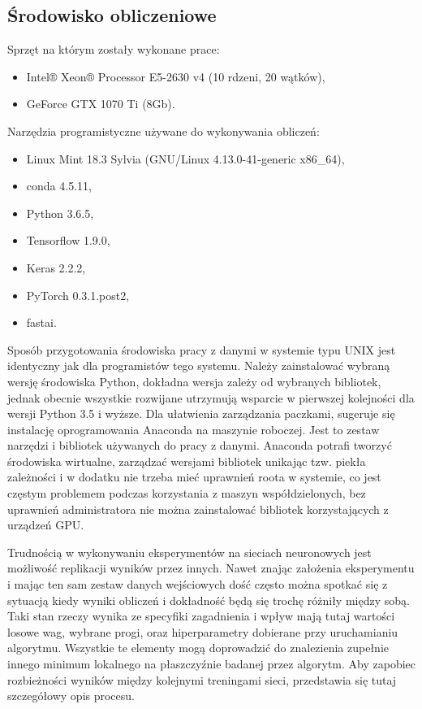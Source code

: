 \documentclass[12pt,a4paper,twoside,titlepage,openright]{book}
\begin{document}
\subsection{Środowisko obliczeniowe}
Sprzęt na którym zostały wykonane prace:
\begin{itemize}
\item Intel® Xeon® Processor E5-2630 v4 (10 rdzeni, 20 wątków),
\item GeForce GTX 1070 Ti (8Gb).
\end{itemize}

Narzędzia programistyczne używane do wykonywania obliczeń:
\begin{itemize}
\item Linux Mint 18.3 Sylvia (GNU/Linux 4.13.0-41-generic x86\_64),
\item conda 4.5.11,
\item Python 3.6.5,
\item Tensorflow 1.9.0,
\item Keras 2.2.2,
\item PyTorch 0.3.1.post2,
\item fastai.
\end{itemize}

Sposób przygotowania środowiska pracy z danymi w systemie typu UNIX jest identyczny jak dla programistów tego systemu. Należy zainstalować wybraną wersję środowiska Python, dokładna wersja zależy od wybranych bibliotek, jednak obecnie wszystkie rozwijane utrzymują wsparcie w pierwszej kolejności dla wersji Python 3.5 i wyższe. Dla ułatwienia zarządzania paczkami, sugeruje się instalację oprogramowania Anaconda na maszynie roboczej. Jest to zestaw narzędzi i bibliotek używanych do pracy z danymi. Anaconda potrafi tworzyć środowiska wirtualne, zarządzać wersjami bibliotek unikając tzw. piekła zależności i w dodatku nie trzeba mieć uprawnień roota w systemie, co jest częstym problemem podczas korzystania z maszyn współdzielonych, bez uprawnień administratora nie można zainstalować bibliotek korzystających z urządzeń GPU.

Trudnością  w wykonywaniu eksperymentów na sieciach neuronowych jest możliwość replikacji wyników przez innych. Nawet znając założenia eksperymentu i mając ten sam zestaw danych wejściowych dość często można spotkać się z sytuacją kiedy wyniki obliczeń i dokładność będą się trochę różniły między sobą. Taki stan rzeczy wynika ze specyfiki zagadnienia i wpływ mają tutaj wartości losowe wag, wybrane progi, oraz hiperparametry dobierane przy uruchamianiu algorytmu. Wszystkie te elementy mogą doprowadzić do znalezienia zupełnie innego minimum lokalnego na płaszczyźnie badanej przez algorytm. Aby zapobiec rozbieżności wyników między kolejnymi treningami sieci, przedstawia się tutaj szczegółowy opis procesu.
\end{document}
